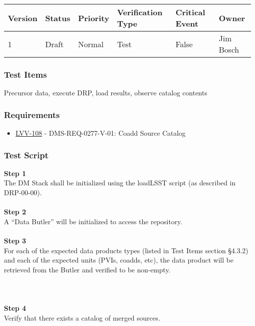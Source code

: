 \begin{longtable}[]{@{}llllll@{}}
\toprule
Version & Status & Priority & Verification Type & Critical Event &
Owner\tabularnewline
\midrule
\endhead
1 & Draft & Normal & Test & False & Jim Bosch\tabularnewline
\bottomrule
\end{longtable}

\hypertarget{test-items-159}{%
\subsubsection{Test Items}\label{test-items-159}}

Precursor data, execute DRP, load results, observe catalog contents

\hypertarget{requirements-160}{%
\subsubsection{Requirements}\label{requirements-160}}

\begin{itemize}
\tightlist
\item
  \href{https://jira.lsstcorp.org/browse/LVV-108}{LVV-108} -
  DMS-REQ-0277-V-01: Coadd Source Catalog
\end{itemize}

\hypertarget{test-script-160}{%
\subsubsection{Test Script}\label{test-script-160}}

\textbf{Step 1}\\
The DM Stack shall be initialized using the loadLSST script (as
described in DRP-00-00).\\
~\\
\textbf{Step 2}\\
A ``Data Butler'' will be initialized to access the repository.\\
~\\
\textbf{Step 3}\\
For each of the expected data products types (listed in Test Items
section §4.3.2) and each of the expected units (PVIs, coadds, etc), the
data product will be retrieved from the Butler and verified to be
non-empty.\\
~\\
~\\
~\\
\textbf{Step 4}\\
Verify that there exists a catalog of merged sources.\\
~\\

